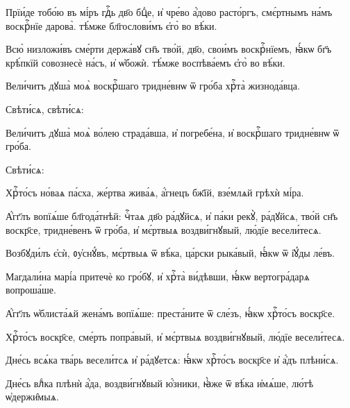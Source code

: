 \hKv  Прїи́де тобо́ю въ мі́ръ гдⷭ҇ь дв҃о бцⷣе, и҆  чре́во а҆́дово расто́ргъ, смє́ртнымъ на́мъ воскрⷭ҇нїе  дарова̀. тѣ́мже бл҃гослови́мъ є҆го̀ во вѣ́ки.  

\hKv  Всю̀ низложи́въ сме́рти держа́вꙋ сн҃ъ тво́й,  дв҃о, свои́мъ воскрⷭ҇нїемъ, ꙗ҆́кѡ бг҃ъ крѣ́пкїй совознесѐ  на́съ, и҆ ѡ҆божѝ. тѣ́мже воспѣва́емъ є҆го̀ во вѣ́ки. 
%

\hKv Вели́читъ дꙋша̀ моѧ̀ воскрⷭ҇шаго тридне́внѡ ѿ гро́ба  хрⷭ҇та̀ жизнода́вца.  

 Свѣти́сѧ, свѣти́сѧ:  


\hKv Вели́читъ дꙋша̀ моѧ̀ во́лею страда́вша, и҆ погребе́на, и҆  воскрⷭ҇шаго тридне́внѡ ѿ гро́ба.  

 Свѣти́сѧ:  
%
%

\hKv Хрⷭ҇то́съ но́ваѧ па́сха, же́ртва жива́ѧ, а҆́гнецъ бж҃їй,  взе́млѧй грѣхѝ мі́ра.  
%

%

\hKv А҆́гг҃лъ вопїѧ́ше бл҃года́тнѣй: чⷭ҇таѧ дв҃о ра́дꙋйсѧ, и҆  па́ки рекꙋ̀, ра́дꙋйсѧ, тво́й сн҃ъ воскр҃се, тридне́венъ ѿ  гро́ба, и҆ мє́ртвыѧ воздви́гнꙋвый, лю́дїе весели́тесѧ.  

%

\hKv Возбꙋди́лъ є҆сѝ, ᲂу҆снꙋ́въ, мє́ртвыѧ ѿ вѣ́ка, ца́рски  рыка́вый, ꙗ҆́кѡ ѿ і҆ꙋ́ды ле́въ.  

\hKv Магдали́на марі́а притечѐ ко гро́бꙋ, и҆ хрⷭ҇та̀ ви́дѣвши,  ꙗ҆́кѡ вертогра́дарѧ вопроша́ше. 

\hKv А҆́гг҃лъ ѡ҆блиста́ѧй жена́мъ вопїѧ́ше: преста́ните ѿ  сле́зъ, ꙗ҆́кѡ хрⷭ҇то́съ воскр҃се. 

\hKv Хрⷭ҇то́съ воскр҃се, сме́рть попра́вый, и҆ мє́ртвыѧ  воздви́гнꙋвый, лю́дїе весели́тесѧ. 

\hKv Дне́сь всѧ́ка тва́рь весели́тсѧ и҆ ра́дꙋетсѧ: ꙗ҆́кѡ  хрⷭ҇то́съ воскр҃се и҆ а҆́дъ плѣни́сѧ. 

\hKv Дне́сь влⷣка плѣнѝ а҆́да, воздви́гнꙋвый ю҆́зники, ꙗ҆̀же  ѿ вѣ́ка и҆мѧ́ше, лю́тѣ ѡ҆держи̑мыѧ. 

